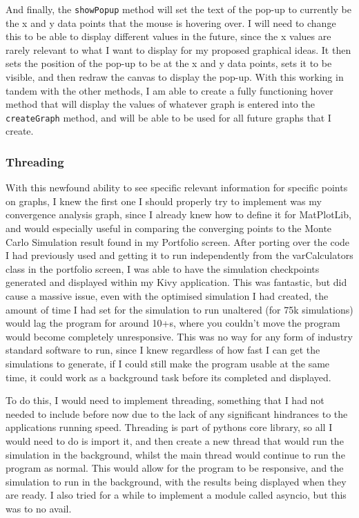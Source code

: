 \documentclass{article}
\begin{document}
\vspace{0.3cm}
And finally, the \texttt{showPopup} method will set the text of the pop-up to currently be the x and y data points that the mouse is hovering over. I will need to change this to be able to display different values in the future, since the x values are rarely relevant to what I want to display for my proposed graphical ideas. It then sets the position of the pop-up to be at the x and y data points, sets it to be visible, and then redraw the canvas to display the pop-up. With this working in tandem with the other methods, I am able to create a fully functioning hover method that will display the values of whatever graph is entered into the \texttt{createGraph} method, and will be able to be used for all future graphs that I create.\\\vspace{0.3cm}

\subsubsection{Threading}
With this newfound ability to see specific relevant information for specific points on graphs, I knew the first one I should properly try to implement was my convergence analysis graph, since I already knew how to define it for MatPlotLib, and would especially useful in comparing the converging points to the Monte Carlo Simulation result found in my Portfolio screen. After porting over the code I had previously used and getting it to run independently from the varCalculators class in the portfolio screen, I was able to have the simulation checkpoints generated and displayed within my Kivy application. This was fantastic, but did cause a massive issue, even with the optimised simulation I had created, the amount of time I had set for the simulation to run unaltered (for 75k simulations) would lag the program for around 10+s, where you couldn't move the program would become completely unresponsive. This was no way for any form of industry standard software to run, since I knew regardless of how fast I can get the simulations to generate, if I could still make the program usable at the same time, it could work as a background task before its completed and displayed.\\\vspace{0.3cm}

To do this, I would need to implement threading, something that I had not needed to include before now due to the lack of any significant hindrances to the applications running speed. Threading is part of pythons core library, so all I would need to do is import it, and then create a new thread that would run the simulation in the background, whilst the main thread would continue to run the program as normal. This would allow for the program to be responsive, and the simulation to run in the background, with the results being displayed when they are ready. I also tried for a while to implement a module called asyncio, but this was to no avail.
\end{document}
